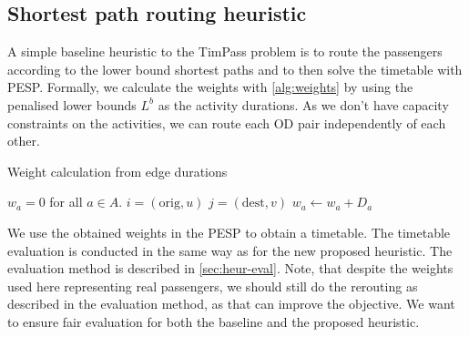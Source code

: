 \documentclass[english, 12pt, a4paper, sci, utf8, a-2b, online]{aaltothesis}
\newcommand{\od}[1][]{\ifthenelse{\isempty{#1}}{\mathrm{OD}}{\mathrm{OD}_{\mathit{#1}}}}
\newcommand{\shortestpath}{\mathit{SP}}
\begin{document}
\subsection{Shortest path routing heuristic}

A simple baseline heuristic to the TimPass problem is to route the passengers according to the lower bound shortest paths and to then solve the timetable with PESP. Formally, we calculate the weights with \cref{alg:weights} by using the penalised lower bounds $L^b$ as the activity durations. As we don't have capacity constraints on the activities, we can route each OD pair independently of each other.


\begin{algorithm}
    \caption{Weight calculation from edge durations}
    \label{alg:weights}
    \begin{algorithmic}
        \State $w_a = 0$ for all $a \in A$.
        \For{$(u, v) \in \od$}
            \State $i = (\mathrm{orig}, u)$
            \State $j = (\mathrm{dest}, v)$
            \For{$a \in \shortestpath_{i, j}(D)$}
                \State $w_a \gets w_a + D_a$
            \EndFor
        \EndFor
    \end{algorithmic}
\end{algorithm}

We use the obtained weights in the PESP to obtain a timetable. The timetable evaluation is conducted in the same way as for the new proposed heuristic. The evaluation method is described in \cref{sec:heur-eval}. Note, that despite the weights used here representing real passengers, we should still do the rerouting as described in the evaluation method, as that can improve the objective. We want to ensure fair evaluation for both the baseline and the proposed heuristic.


\end{document}
